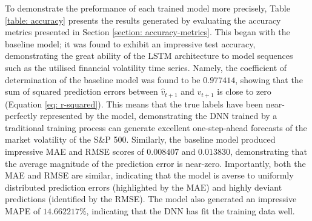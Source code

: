 \documentclass[a4paper, 11pt]{report}
\begin{document}
    To demonstrate the preformance of each trained model more precisely, Table \ref{table: accuracy} presents the results generated by evaluating the accuracy metrics presented in Section \ref{section: accuracy-metrics}. This began with the baseline model; it was found to exhibit an impressive test accuracy, demonstrating the great ability of the LSTM architecture to model sequences such as the utilised financial volatility time series. Namely, the coefficient of determination of the baseline model was found to be $0.977414$, showing that the sum of squared prediction errors between $\hat{v}_{t+1}$ and $v_{t+1}$ is close to zero (Equation \ref{eq: r-squared}). This means that the true labels have been near-perfectly represented by the model, demonstrating the DNN trained by a traditional training process can generate excellent one-step-ahead forecasts of the market volatility of the S\&P 500. Similarly, the baseline model produced impressive MAE and RMSE scores of $0.008407$ and $0.013830$, demonstrating that the average magnitude of the prediction error is near-zero. Importantly, both the MAE and RMSE are similar, indicating that the model is averse to uniformly distributed prediction errors (highlighted by the MAE) and highly deviant predictions (identified by the RMSE). The model also generated an impressive MAPE of $14.662217\%$, indicating that the DNN has fit the training data well.
\end{document}
